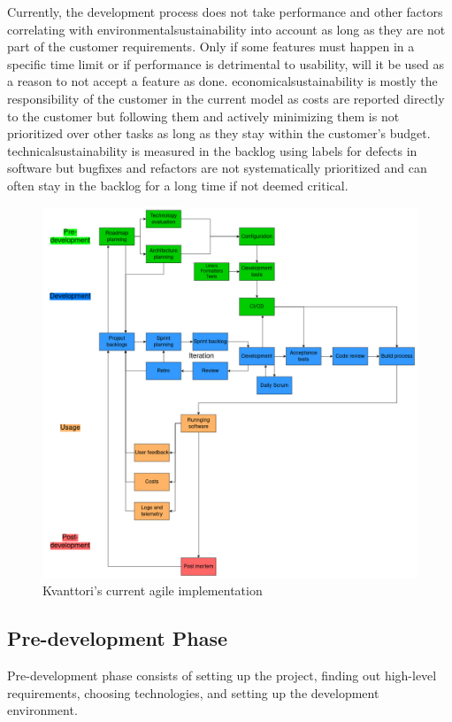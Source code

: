 Currently, the development process does not take performance and other factors correlating with \gls{environmentalsustainability} into account as long as they are not part of the customer requirements. Only if some features must happen in a specific time limit or if performance is detrimental to usability, will it be used as a reason to not accept a feature as done. \Gls{economicalsustainability} is mostly the responsibility of the customer in the current model as costs are reported directly to the customer but following them and actively minimizing them is not prioritized over other tasks as long as they stay within the customer's budget. \Gls{technicalsustainability} is measured in the backlog using labels for defects in software but bugfixes and refactors are not systematically prioritized and can often stay in the backlog for a long time if not deemed critical.

\begin{figure}[H]
\caption{Kvanttori's current agile implementation}
\label{kvanttoriagile}
\includegraphics[width=\textwidth]{images/currentagile.png}
\centering
\end{figure}

\subsection{Pre-development Phase}
Pre-development phase consists of setting up the project, finding out high-level requirements, choosing technologies, and setting up the development environment.

